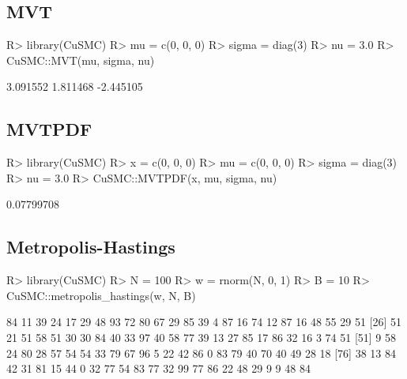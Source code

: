 \documentclass[
]{jss}
\begin{document}
\hypertarget{mvt}{%
\subsection{MVT}\label{mvt}}

\begin{CodeChunk}

\begin{CodeInput}
R> library(CuSMC)
R> mu = c(0, 0, 0)
R> sigma = diag(3)
R> nu = 3.0
R> CuSMC::MVT(mu, sigma, nu)
\end{CodeInput}

\begin{CodeOutput}
[1]  3.091552  1.811468 -2.445105
\end{CodeOutput}
\end{CodeChunk}

\hypertarget{mvtpdf}{%
\subsection{MVTPDF}\label{mvtpdf}}

\begin{CodeChunk}

\begin{CodeInput}
R> library(CuSMC)
R> x = c(0, 0, 0)
R> mu = c(0, 0, 0)
R> sigma = diag(3)
R> nu = 3.0
R> CuSMC::MVTPDF(x, mu, sigma, nu)
\end{CodeInput}

\begin{CodeOutput}
[1] 0.07799708
\end{CodeOutput}
\end{CodeChunk}

\hypertarget{metropolis-hastings}{%
\subsection{Metropolis-Hastings}\label{metropolis-hastings}}

\begin{CodeChunk}

\begin{CodeInput}
R> library(CuSMC)
R> N = 100
R> w = rnorm(N, 0, 1)
R> B = 10
R> CuSMC::metropolis_hastings(w, N, B)
\end{CodeInput}

\begin{CodeOutput}
  [1] 84 11 39 24 17 29 48 93 72 80 67 29 85 39  4 87 16 74 12 87 16 48 55 29 51
 [26] 51 21 51 58 51 30 30 84 40 33 97 40 58 77 39 13 27 85 17 86 32 16  3 74 51
 [51]  9 58 24 80 28 57 54 54 33 79 67 96  5 22 42 86  0 83 79 40 70 40 49 28 18
 [76] 38 13 84 42 31 81 15 44  0 32 77 54 83 77 32 99 77 86 22 48 29  9  9 48 84
\end{CodeOutput}
\end{CodeChunk}
\end{document}

